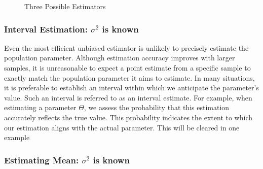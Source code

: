 \documentclass[12pt,a4paper]{article}
\theoremstyle{example}
\theoremstyle{definition}
\theoremstyle{theorem}
\begin{document}
\begin{figure}
    \centering
    \caption{Three Possible Estimators}
\end{figure}

\subsubsection{Interval  Estimation: $\sigma^2$ is known }\label{estimationmuknown}
Even the most efficient unbiased estimator is unlikely to precisely estimate the population parameter. Although estimation accuracy improves with larger samples, it is unreasonable to expect a point estimate from a specific sample to exactly match the population parameter it aims to estimate. In many situations, it is preferable to establish an interval within which we anticipate the parameter's value. Such an interval is referred to as an interval estimate.
For example, when estimating a parameter $\Theta$, we assess the probability that this estimation accurately reflects the true value. This probability indicates the extent to which our estimation aligns with the actual parameter. This will be cleared in one example 
\subsubsection{Estimating Mean: $\sigma^2$ is known }
\end{document}
